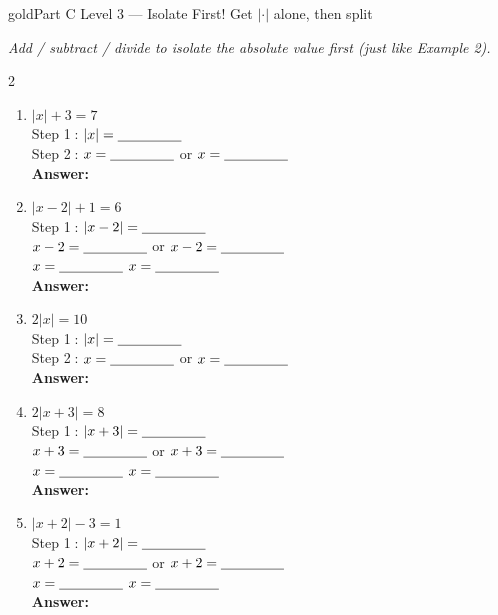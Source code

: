\documentclass[12pt]{article}
\newcommand{\wsp}{\vspace{2.6cm}}
\newcommand{\blank}{\underline{\hspace{2.8cm}}}
\newcommand{\sblank}{\underline{\hspace{1.6cm}}}
\begin{document}
\newpage

\begin{partbox}{gold}{Part C \quad Level 3 --- Isolate First!
  \hfill{\normalfont\small Get $|\cdot|$ alone, then split}}

\textit{Add / subtract / divide to isolate the absolute value first (just like Example 2).}
\vspace{8pt}
\begin{multicols}{2}
\begin{enumerate}[label=\textbf{\arabic*.}, itemsep=0pt]

  \item $|x| + 3 = 7$\\[3pt]
  Step \textcircled{1}: $|x| = \sblank$\\[3pt]
  Step \textcircled{2}: $x = \sblank$ or $x = \sblank$\\[3pt]
  \textbf{Answer:} \blank
  \wsp

  \item $|x - 2| + 1 = 6$\\[3pt]
  Step \textcircled{1}: $|x-2| = \sblank$\\[3pt]
  $x - 2 = \sblank$ or $x - 2 = \sblank$\\[3pt]
  $x = \sblank$ \hspace{0.9cm} $x = \sblank$\\[3pt]
  \textbf{Answer:} \blank
  \wsp

  \item $2|x| = 10$\\[3pt]
  Step \textcircled{1}: $|x| = \sblank$\\[3pt]
  Step \textcircled{2}: $x = \sblank$ or $x = \sblank$\\[3pt]
  \textbf{Answer:} \blank
  \wsp

  \item $2|x + 3| = 8$\\[3pt]
  Step \textcircled{1}: $|x+3| = \sblank$\\[3pt]
  $x + 3 = \sblank$ or $x + 3 = \sblank$\\[3pt]
  $x = \sblank$ \hspace{0.9cm} $x = \sblank$\\[3pt]
  \textbf{Answer:} \blank
  \wsp

  \item $|x + 2| - 3 = 1$\\[3pt]
  Step \textcircled{1}: $|x+2| = \sblank$\\[3pt]
  $x + 2 = \sblank$ or $x + 2 = \sblank$\\[3pt]
  $x = \sblank$ \hspace{0.9cm} $x = \sblank$\\[3pt]
  \textbf{Answer:} \blank
  \wsp


\end{enumerate}
\end{multicols}
\end{partbox}
\end{document}
